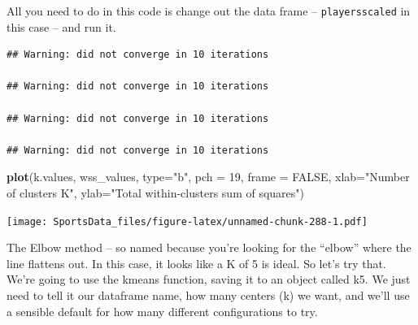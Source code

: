\documentclass[]{book}
\newenvironment{Shaded}{\begin{snugshade}}{\end{snugshade}}
\newcommand{\CommentTok}[1]{\textcolor[rgb]{0.56,0.35,0.01}{\textit{#1}}}
\newcommand{\ControlFlowTok}[1]{\textcolor[rgb]{0.13,0.29,0.53}{\textbf{#1}}}
\newcommand{\DataTypeTok}[1]{\textcolor[rgb]{0.13,0.29,0.53}{#1}}
\newcommand{\DecValTok}[1]{\textcolor[rgb]{0.00,0.00,0.81}{#1}}
\newcommand{\KeywordTok}[1]{\textcolor[rgb]{0.13,0.29,0.53}{\textbf{#1}}}
\newcommand{\NormalTok}[1]{#1}
\newcommand{\OperatorTok}[1]{\textcolor[rgb]{0.81,0.36,0.00}{\textbf{#1}}}
\newcommand{\OtherTok}[1]{\textcolor[rgb]{0.56,0.35,0.01}{#1}}
\newcommand{\StringTok}[1]{\textcolor[rgb]{0.31,0.60,0.02}{#1}}
\begin{document}
All you need to do in this code is change out the data frame -- \texttt{playersscaled} in this case -- and run it.

\begin{Shaded}
\end{Shaded}

\begin{verbatim}
## Warning: did not converge in 10 iterations

## Warning: did not converge in 10 iterations

## Warning: did not converge in 10 iterations

## Warning: did not converge in 10 iterations
\end{verbatim}

\begin{Shaded}
\begin{Highlighting}[]
\KeywordTok{plot}\NormalTok{(k.values, wss_values,}
       \DataTypeTok{type=}\StringTok{"b"}\NormalTok{, }\DataTypeTok{pch =} \DecValTok{19}\NormalTok{, }\DataTypeTok{frame =} \OtherTok{FALSE}\NormalTok{, }
       \DataTypeTok{xlab=}\StringTok{"Number of clusters K"}\NormalTok{,}
       \DataTypeTok{ylab=}\StringTok{"Total within-clusters sum of squares"}\NormalTok{)}
\end{Highlighting}
\end{Shaded}

\texttt{[image: SportsData\_files/figure-latex/unnamed-chunk-288-1.pdf]}

The Elbow method -- so named because you're looking for the ``elbow'' where the line flattens out. In this case, it looks like a K of 5 is ideal. So let's try that. We're going to use the kmeans function, saving it to an object called k5. We just need to tell it our dataframe name, how many centers (k) we want, and we'll use a sensible default for how many different configurations to try.
\end{document}
